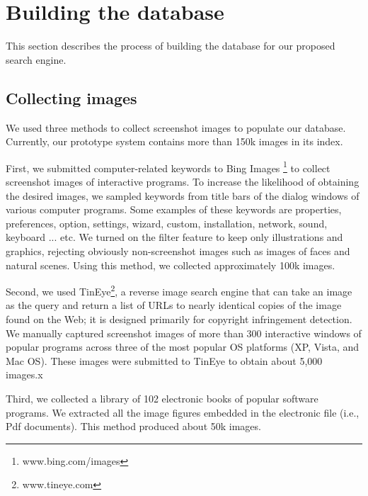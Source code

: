 \documentclass{www2010-submission}
\begin{document}
\section{Building the database}
\label{sec:building}

This section describes the process of building the database for
our proposed search engine.

\subsection{Collecting images}


We used three methods to collect screenshot images to populate our
database. Currently, our prototype system contains more than 150k
images in its index.

First, we submitted computer-related keywords to Bing Images
\footnote{www.bing.com/images} to collect screenshot images of
interactive programs. To increase the likelihood of obtaining the
desired images, we sampled keywords from title bars of the dialog
windows of various computer programs. Some examples of these keywords
are properties, preferences, option, settings, wizard, custom,
installation, network, sound, keyboard ... etc. We turned on the
filter feature to keep only illustrations and graphics, rejecting
obviously non-screenshot images such as images of faces and natural
scenes.  Using this method, we collected approximately 100k images.

Second, we used TinEye\footnote{www.tineye.com}, a reverse image
search engine that can take an image as the query and return a list of
URLs to nearly identical copies of the image found on the Web; it is
designed primarily for copyright infringement detection. We manually
captured screenshot images of more than 300 interactive windows of
popular programs across three of the most popular OS platforms (XP,
Vista, and Mac OS). These images were submitted to TinEye to obtain
about 5,000 images.x

Third, we collected a library of 102 electronic books of popular
software programs. We extracted all the image figures embedded in the
electronic file (i.e., Pdf documents). This method produced about
50k images.
\end{document}
